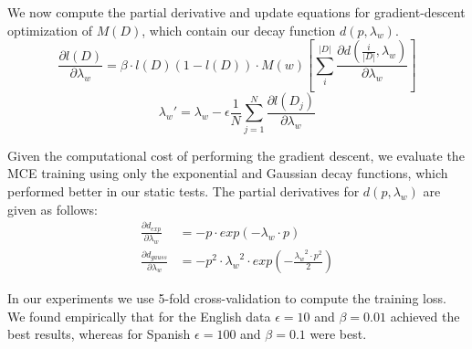 We now compute the partial derivative and update equations for gradient-descent optimization of $M(D)$, which contain our decay function $d(p,\lambda_w)$.
\begin{equation}
\frac{ \partial l(D) }{ \partial \lambda_{w} } = \beta\cdot l(D)(1 - l(D))\cdot M(w)
\left [ {\sum_i^{|D|}{\frac{\partial d(\frac{i}{|D|},\lambda_w)}{\partial \lambda_w}}} \right ]
\end{equation}                                                                                                                                            
\begin{equation}        
  {\lambda_w}' = \lambda_w - \epsilon \frac{1}{N}\sum_{j=1}^N{\frac{\partial l(D_j)}{\partial \lambda_w}}
\end{equation}                                                                                                                                            

Given the computational cost of performing the gradient descent, we evaluate the MCE training using only the exponential and Gaussian decay functions, which performed better in our static tests.  The partial derivatives for $d(p,\lambda_w)$ are given as follows:
\begin{align}
\frac{\partial d_{exp}}{\partial \lambda_w} &= -p \cdot exp \left({ -\lambda_w \cdot p }\right)\\
\frac{\partial d_{gauss}}{\partial \lambda_w} &= -p^2\cdot{\lambda_w}^2 \cdot exp \left({ -\frac{{\lambda_w}^2 \cdot p^2}{2} }\right)                      
\end{align}     %

In our experiments we use 5-fold cross-validation to compute the training loss.  We found empirically that for the English data $\epsilon=10$ and $\beta=0.01$ achieved the best results, whereas for Spanish $\epsilon=100$ and $\beta=0.1$ were best.  

\label{sec:mceAppendix}
